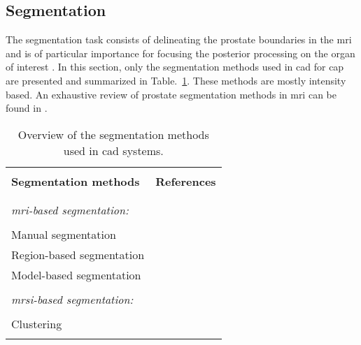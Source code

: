 \subsection{Segmentation}\label{subsec:chp3:img-reg:seg}
The segmentation task consists of delineating the prostate boundaries in the \ac{mri} and is of particular importance for focusing the posterior processing on the organ of interest \cite{Ghose2012}. 
In this section, only the segmentation methods used in \ac{cad} for \ac{cap} are presented and summarized in Table.~\ref{tab:summary-seg}.
These methods are mostly intensity based.
 An exhaustive review of prostate segmentation methods in \ac{mri} can be found in \cite{Ghose2012}.


\begin{table}
  \caption{Overview of the segmentation methods used in \ac{cad} systems.}
  \small
  \renewcommand{\arraystretch}{.8}
  \begin{tabular}{p{.65\linewidth} p{.25\linewidth}}
    \hline \\ [-1.5ex]
    \textbf{Segmentation methods} & \textbf{References} \\ \\ [-1.5ex]
    \hline \\ [-1.5ex]
    \textit{\ac{mri}-based segmentation:} & \\ \\ [-1.5ex]
    \quad Manual segmentation & \cite{Artan2009,Artan2010,Matulewicz2013,Niaf2011,Niaf2012,Ozer2009,Ozer2010,Puech2009,Vos2008,Vos2008a,Vos2010,Vos2012} \\
    \quad Region-based segmentation & \cite{Litjens2012,Litjens2014} \\
    \quad Model-based segmentation & \cite{Litjens2011,Viswanath2008a,Viswanath2009,Viswanath2011,Vos2012} \\ \\ [-1.5ex]
    \textit{\ac{mrsi}-based segmentation:} & \\ \\ [-1.5ex]
    \quad Clustering & \cite{Tiwari2009} \\ \\ [-1.5ex]
    \hline
  \end{tabular}
\label{tab:summary-seg}
\end{table}



